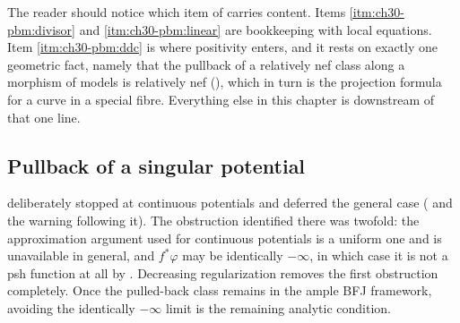 The reader should notice which item of
 carries content.  Items
\cref{itm:ch30-pbm:divisor} and \cref{itm:ch30-pbm:linear} are bookkeeping
with local equations.  Item \cref{itm:ch30-pbm:ddc} is where positivity
enters, and it rests on exactly one geometric fact, namely that the pullback
of a relatively nef class along a morphism of models is relatively nef
(), which in turn is the projection formula for a
curve in a special fibre.  Everything else in this chapter is downstream of
that one line.

\subsection{Pullback of a singular potential}
\label{sec:ch30-pullback-singular}

 deliberately stopped at continuous potentials and
deferred the general case ( and the warning
following it).  The obstruction identified there was twofold: the
approximation argument used for continuous potentials is a uniform one and
is unavailable in general, and \(f^*\varphi\) may be identically \(-\infty\),
in which case it is not a psh function at all by
.  Decreasing regularization removes the first
obstruction completely.  Once the pulled-back class remains in the ample
BFJ framework, avoiding the identically \(-\infty\) limit is the remaining
analytic condition.

